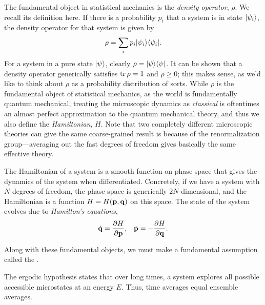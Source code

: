 \documentclass[11pt]{article}
\begin{document}


The fundamental object in statistical mechanics is the \emph{density operator},
$\rho$. We recall its definition here. If there is a probability $p_i$ that
a system is in state $\lvert\psi_i\rangle$, the density operator for that system
is given by 
\begin{align*}
    \rho = \sum_i p_i | \psi_i \rangle \langle \psi_i |.
\end{align*}
For a system in a pure state $\lvert\psi\rangle$, clearly $\rho = | \psi \rangle \langle \psi |$.
It can be shown that a density operator generically satisfies $\operatorname{tr}{\rho} = 1$
and $\rho \geq 0$; this makes sense, as we'd like to think about $\rho$ as
a probability distribution of sorts. While $\rho$ is the fundamental object
of statistical mechanics, as the world is fundamentally quantum mechanical,
treating the microscopic dynamics as \emph{classical} is oftentimes an almost
perfect approximation to the quantum mechanical theory, and thus we also define
the \emph{Hamiltonian}, $H$. Note that two completely different microscopic
theories can give the same coarse-grained result is because of the renormalization
group---averaging out the fast degrees of freedom gives basically the same effective theory.

The Hamiltonian of a system is a smooth function on phase space that gives the
dynamics of the system when differentiated. Concretely, if we have a system with 
$N$ degrees of freedom, the phase space is generically $2N$-dimensional, and the Hamiltonian
is a function $H = H(\mathbf{p}, \mathbf{q})$ on this space. The state of the system
evolves due to \emph{Hamilton's equations},
\begin{align*}
    & \dot{\mathbf{q}} = \frac{\partial H}{\partial \mathbf{p}},
    & \dot{\mathbf{p}} = - \frac{\partial H}{\partial \mathbf{q}}.
\end{align*}


Along with these fundamental objects, we must make a fundamental assumption
called the .

\begin{iidea}
    The ergodic hypothesis states that over long times, a system explores
    all possible accessible microstates at an energy $E$. Thus, time averages 
    equal ensemble averages. 
\end{iidea}
\end{document}
